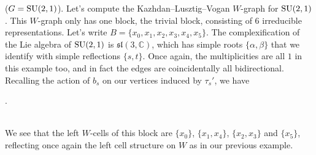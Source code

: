 \noindent\begin{example}\textup{($G = \textup{SU}(2, 1)$).} Let's compute the Kazhdan--Lusztig--Vogan $W$-graph for $\textup{SU}(2, 1)$. This $W$-graph only has one block, the trivial block, consisting of $6$ irreducible representations. Let's write $B = \{x_0, x_1, x_2, x_3, x_4, x_5\}$. The complexification of the Lie algebra of $\textup{SU}(2, 1)$ is $\mathfrak{sl}(3, \mathbb{C})$, which has simple roots $\{\alpha, \beta\}$ that we identify with simple reflections $\{s, t\}$. Once again, the multiplicities are all $1$ in this example too, and in fact the edges are coincidentally all bidirectional. Recalling the action of $b_s$ on our vertices induced by $\tau_s'$, we have\\[-3\linespacing]
\begin{center}
.
\end{center}
\noindent\\[-3.5\linespacing] We see that the left $W$-cells of this block are $\{x_0\}$, $\{x_1, x_4\}$, $\{x_2, x_3\}$ and $\{x_5\}$, reflecting once again the left cell structure on $W$ as in our previous example.
\end{example}

\newpage
\renewcommand\thesection{R}
\begingroup
\setlength{\emergencystretch}{.5em}
\printbibliography[heading=none]
\endgroup

